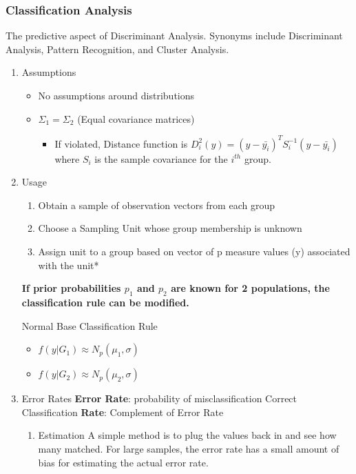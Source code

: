 \documentclass[11pt]{article}
\begin{document}
\subsubsection{Classification Analysis}
\label{sec:org75799c5}
The predictive aspect of Discriminant Analysis. Synonyms include
Discriminant Analysis, Pattern Recognition, and Cluster Analysis.

\begin{enumerate}
\item Assumptions
\label{sec:org9cadce6}
\begin{itemize}
\item No assumptions around distributions
\item \(\Sigma_1 = \Sigma_2\) (Equal covariance matrices)

\begin{itemize}
\item If violated, Distance function is
\(D_i^2(y) = (y - \bar{y_i})^TS_i^{-1}(y - \bar{y_i})\) where \(S_i\)
is the sample covariance for the \(i^{th}\) group.
\end{itemize}
\end{itemize}

\item Usage
\label{sec:org659d842}
\begin{enumerate}
\item Obtain a sample of observation vectors from each group
\item Choose a Sampling Unit whose group membership is unknown
\item Assign unit to a group based on vector of p measure values (y)
associated with the unit*
\end{enumerate}

\textbf{If prior probabilities \(p_1\) and \(p_2\) are known for 2 populations, the classification rule can be modified.}

Normal Base Classification Rule
\begin{itemize}
\item \(f(y | G_1) \approx N_p(\mu_1, \sigma)\)
\item \(f(y | G_2) \approx N_p(\mu_2, \sigma)\)
\end{itemize}

\item Error Rates
\label{sec:orgb2c8c72}
\textbf{Error Rate}: probability of misclassification Correct Classification
\textbf{Rate}: Complement of Error Rate

\begin{enumerate}
\item Estimation
\label{sec:org8f053bc}
A simple method is to plug the values back in and see how many matched.
For large samples, the error rate has a small amount of bias for
estimating the actual error rate.


\end{enumerate}
\end{enumerate}
\end{document}
